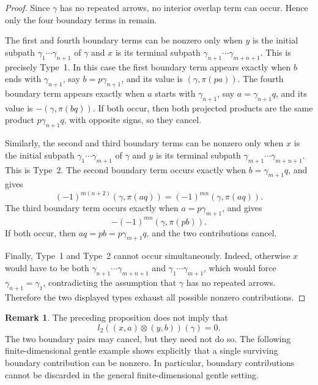 \documentclass[11pt,a4paper,reqno]{amsart}
\newcommand{\para}[2]{(#1,#2)}
\theoremstyle{plain}
\theoremstyle{definition}
\newtheorem{remark}[remark]{Remark}
\numberwithin{equation}{section}
\begin{document}
	\begin{proof}
		Since $\gamma$ has no repeated arrows, no interior overlap term can
		occur.  Hence only the four boundary terms in  remain.
		
		The first and fourth boundary terms can be nonzero only when $y$ is the
		initial subpath $\gamma_1\cdots\gamma_{n+1}$ of $\gamma$ and $x$ is its
		terminal subpath $\gamma_{n+1}\cdots\gamma_{m+n+1}$.
		This is precisely Type~1.  In this case the first boundary term appears exactly
		when $b$ ends with $\gamma_{n+1}$, say $b=p\gamma_{n+1}$, and its value is
		$\para{\gamma}{\pi(pa)}$.  The fourth boundary term appears exactly when
		$a$ starts with $\gamma_{n+1}$, say $a=\gamma_{n+1}q$, and its value is
		$-\para{\gamma}{\pi(bq)}$.  If both occur, then both projected products are
		the same product $p\gamma_{n+1}q$, with opposite signs, so they cancel.
		
		Similarly, the second and third boundary terms can be nonzero only when $x$
		is the initial subpath $\gamma_1\cdots\gamma_{m+1}$ of $\gamma$ and $y$
		is its terminal subpath $\gamma_{m+1}\cdots\gamma_{m+n+1}$.
		This is Type~2.  The second boundary term occurs exactly when
		$b=\gamma_{m+1}q$, and gives
		\[
		(-1)^{m(n+2)}\para{\gamma}{\pi(aq)}
		=
		(-1)^{mn}\para{\gamma}{\pi(aq)}.
		\]
		The third boundary term occurs exactly when $a=p\gamma_{m+1}$, and gives
		\[
		-(-1)^{mn}\para{\gamma}{\pi(pb)}.
		\]
		If both occur, then $aq=pb=p\gamma_{m+1}q$, and the two contributions cancel.
		
		Finally, Type~1 and Type~2 cannot occur simultaneously.  Indeed, otherwise
		$x$ would have to be both $\gamma_{n+1}\cdots\gamma_{m+n+1}$ and
		$\gamma_1\cdots\gamma_{m+1}$,
		which would force $\gamma_{n+1}=\gamma_1$, contradicting the assumption that
		$\gamma$ has no repeated arrows.  Therefore the two displayed types exhaust
		all possible nonzero contributions.
	\end{proof}
	\begin{remark}
		The preceding proposition does not imply that
		\[
		l_2(\para{x}{a}\otimes\para{y}{b})(\gamma)=0.
		\]
		The two boundary pairs may cancel, but they need not do so.  The following
		finite-dimensional gentle example shows explicitly that a single surviving
		boundary contribution can be nonzero.  In particular, boundary contributions
		cannot be discarded in the general finite-dimensional gentle setting.
	\end{remark}
\end{document}
